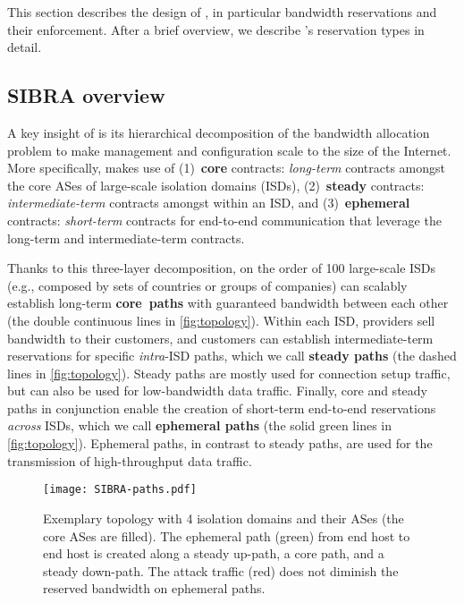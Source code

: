 \noindent This section describes the design of \name, in particular bandwidth
reservations and their enforcement. After a brief overview, we describe \name's
reservation types in detail.


\subsection{SIBRA overview}
\label{sec:overview}

\noindent A key insight of \name is its hierarchical decomposition of the
bandwidth allocation problem to make management and configuration scale to the
size of the Internet. More specifically, \name makes use of 
(1)~\textbf{core} contracts:
\emph{long-term} contracts amongst the core ASes of large-scale isolation domains (ISDs),
(2)~\textbf{steady} contracts:
\emph{intermediate-term} contracts amongst \ADs within an ISD, and
(3)~\textbf{ephemeral} contracts:
\emph{short-term} contracts for end-to-end communication that leverage the long-term
and inter\-mediate-term contracts.

Thanks to this three-layer decomposition, on the order of 100 large-scale ISDs (e.g.,
composed by sets of countries or groups of companies) can scalably establish
long-term \textbf{core~paths} with guaranteed bandwidth between each other (the
double continuous lines in \autoref{fig:topology}). Within each ISD, providers
sell bandwidth to their customers, and customers can establish
inter\-mediate-term reservations for specific \emph{intra}-ISD paths, which we
call \textbf{steady paths} (the dashed lines in \autoref{fig:topology}). Steady
paths are mostly used for connection setup traffic, but can also be used for
low-bandwidth data traffic.
Finally, core and steady paths in conjunction enable the creation of short-term
end-to-end reservations \emph{across} ISDs, which we call
\textbf{ephemeral paths} (the solid green lines in
\autoref{fig:topology}). Ephemeral paths, in contrast to steady paths,
are used for the transmission of high-throughput data traffic.

\begin{figure}[t]
  \begin{center}
    \texttt{[image: SIBRA-paths.pdf]}
  \end{center}
  \vspace{-5mm}
  \caption{Exemplary \name topology with 4 isolation domains and their ASes
  (the core ASes are filled). The ephemeral path (green) from end host  to
  end host  is created along a steady up-path, a core path, and a steady
  down-path. The attack traffic (red) does not diminish the reserved bandwidth
  on ephemeral paths.}
  \label{fig:topology}
  \vspace{-7mm}
\end{figure}

